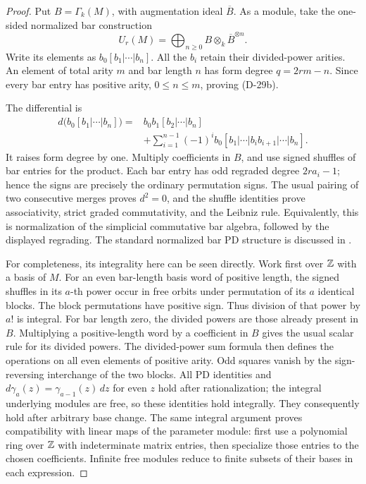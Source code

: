 \begin{proof}
Put \(B=\Gamma_k(M)\), with augmentation ideal
\(\overline B\). As a module, take the one-sided normalized
bar construction
\[
 U_r(M)=\bigoplus_{n\ge0} B\otimes_k\overline B^{\otimes n}.
 \tag{D-29c}
\]
Write its elements as \(b_0[b_1|\cdots|b_n]\).
All the \(b_i\) retain their divided-power arities.
An element of total arity \(m\) and bar length \(n\)
has form degree \(q=2rm-n\). Since every bar entry
has positive arity, \(0\le n\le m\), proving (D-29b).

The differential is
\[
\begin{aligned}
d\bigl(b_0[b_1|\cdots|b_n]\bigr)
={}&b_0b_1[b_2|\cdots|b_n]\\
 &+\sum_{i=1}^{n-1}(-1)^i
 b_0[b_1|\cdots|b_i b_{i+1}|\cdots|b_n].
\end{aligned}
 \tag{D-29d}
\]
It raises form degree by one. Multiply coefficients
in \(B\), and use signed shuffles of bar entries for
the product. Each bar entry has odd regraded degree
\(2ra_i-1\); hence the signs are precisely the ordinary
permutation signs. The usual pairing of two consecutive
merges proves \(d^2=0\), and the shuffle identities prove
associativity, strict graded commutativity, and the
Leibniz rule. Equivalently, this is normalization of
the simplicial commutative bar algebra, followed by the
displayed regrading. The standard normalized bar
PD structure is discussed in
\cite[Theorem~7.5, pp.~250--251; \S8, pp.~252--253]{D_Richter2009}.

For completeness, its integrality here can be seen directly.
Work first over \(\mathbb Z\) with a basis of \(M\).
For an even bar-length basis word of positive length,
the signed shuffles in its \(a\)-th power occur in free
orbits under permutation of its \(a\) identical blocks.
The block permutations have positive sign. Thus division
of that power by \(a!\) is integral. For bar length zero,
the divided powers are those already present in \(B\).
Multiplying a positive-length word by a coefficient in
\(B\) gives the usual scalar rule for its divided powers.
The divided-power sum formula then defines the operations
on all even elements of positive arity. Odd squares
vanish by the sign-reversing interchange of the two
blocks. All PD identities and
\(d\gamma_a(z)=\gamma_{a-1}(z)\,dz\) for even \(z\)
hold after rationalization; the integral underlying
modules are free, so these identities hold integrally.
They consequently hold after arbitrary base change.
The same integral argument proves compatibility with
linear maps of the parameter module: first use a polynomial
ring over \(\mathbb Z\) with indeterminate matrix entries,
then specialize those entries to the chosen coefficients. Infinite free
modules reduce to finite subsets of their bases in
each expression.


\end{proof}

